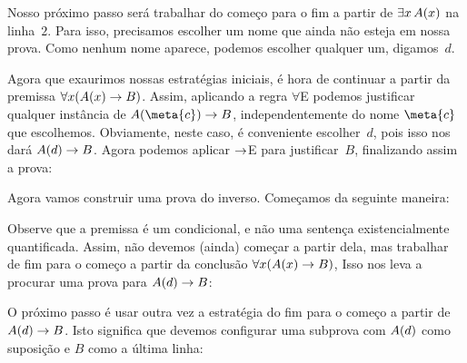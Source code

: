 \begin{fitchproof}
	\open
	\ellipsesline
	\close
\end{fitchproof}
Nosso pr\'oximo passo ser\'a trabalhar do come\c co para o fim a partir de $\exists x\,\mathord{A}(x)$ na linha~$2$. Para isso, precisamos escolher um nome que ainda n\~ao esteja em nossa prova. Como nenhum nome aparece, podemos escolher qualquer um, digamos~$d$.
\begin{fitchproof}
	\open
	\open
	\ellipsesline
	\close
	\close
\end{fitchproof}
Agora que exaurimos nossas estrat\'egias iniciais,  \'e hora de continuar  a partir da premissa $\forall x(\mathord{A}(x) \rightarrow B)$. Assim, aplicando a regra $\forall$E podemos justificar qualquer inst\^ancia de $A(\meta{c}) \eif B$, independentemente do nome $\meta{c}$ que escolhemos. Obviamente, neste caso, \'e conveniente  escolher~$d$, pois isso nos dar\'a $\mathord{A}(d) \rightarrow B$. Agora podemos aplicar $\rightarrow$E para justificar~$B$, finalizando assim a prova:

 
\begin{fitchproof}
	\open
	\open
	\close
	\close
\end{fitchproof}

Agora vamos construir uma prova do inverso. Come\c camos da seguinte maneira:
\begin{fitchproof}
	\ellipsesline
\end{fitchproof}
Observe que a premissa \'e um condicional, e n\~ao uma senten\c ca  existencialmente quantificada. Assim, n\~ao devemos (ainda) come\c car a partir  dela,  mas trabalhar de fim para o come\c co a partir da conclus\~ao $\forall x(\mathord{A}(x) \rightarrow B)$, Isso nos leva a procurar uma prova para $\mathord{A}(d) \rightarrow B$:
\begin{fitchproof}
	\ellipsesline
\end{fitchproof}
O pr\'oximo passo \'e usar outra vez a estrat\'egia do fim para o come\c co a partir de  $\mathord{A}(d) \rightarrow B$.  Isto significa que devemos configurar uma subprova  com  $\mathord{A}(d)$ como suposi\c c\~ao  e $B$ como a \'ultima linha:  
 
